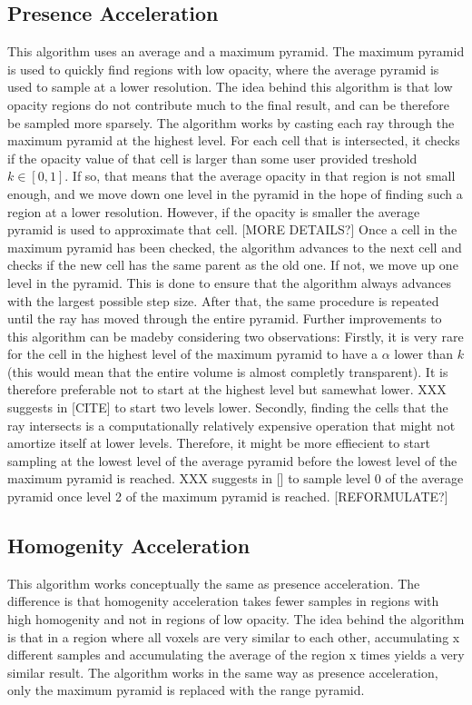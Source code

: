 \subsection{Presence Acceleration}
This algorithm uses an average and a maximum pyramid. The maximum pyramid is used to quickly find regions with low opacity, where the average pyramid is used to sample at a lower resolution. The idea behind this algorithm is that low opacity regions do not contribute much to the final result, and can be therefore be sampled more sparsely.
The algorithm works by casting each ray through the maximum pyramid at the highest level. For each cell that is intersected, it checks if the opacity value of that cell is larger than some user provided treshold $k \in [0, 1]$.
If so, that means that the average opacity in that region is not small enough, and we move down one level in the pyramid in the hope of finding such a region at a lower resolution.
However, if the opacity is smaller the average pyramid is used to approximate that cell. [MORE DETAILS?]
Once a cell in the maximum pyramid has been checked, the algorithm advances to the next cell and checks if the new cell has the same parent as the old one. If not, we move up one level in the pyramid. This is done to ensure that the algorithm always advances with the largest possible step size.
After that, the same procedure is repeated until the ray has moved through the entire pyramid.
Further improvements to this algorithm can be madeby considering two observations:
Firstly, it is very rare for the cell in the highest level of the maximum pyramid to have a $\alpha$ lower than $k$ (this would mean that the entire volume is almost completly transparent). It is therefore preferable not to start at the highest level but samewhat lower. XXX suggests in [CITE] to start two levels lower.
Secondly, finding the cells that the ray intersects is a computationally relatively expensive operation that might not amortize itself at lower levels. Therefore, it might be more effiecient to start sampling at the lowest level of the average pyramid before the lowest level of the maximum pyramid is reached. XXX suggests in [] to sample level 0  of the average pyramid once level 2 of the maximum pyramid is reached. [REFORMULATE?]



\subsection{Homogenity Acceleration}
This algorithm works conceptually the same as presence acceleration. The difference is that homogenity acceleration takes fewer samples in regions with high homogenity and not in regions of low opacity. The idea behind the algorithm is that in a region where all voxels are very similar to each other, accumulating x different samples and accumulating the average of the region x times yields a very similar result. The algorithm works in the same way as presence acceleration, only the maximum pyramid is replaced with the range pyramid.

